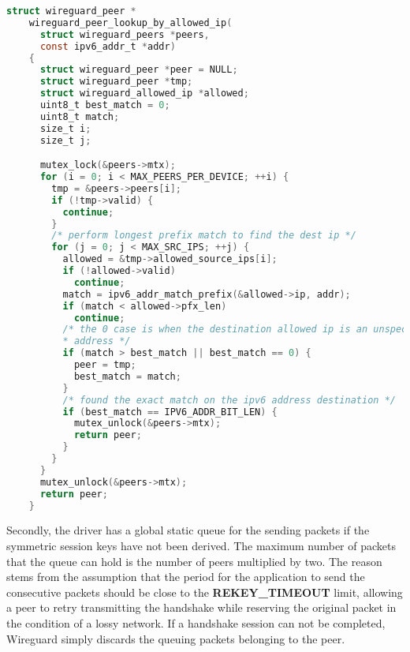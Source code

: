   \begin{lstlisting}[caption = Allowed IP address lookup,language=C, label={lst:allowedip}]
    struct wireguard_peer *
    wireguard_peer_lookup_by_allowed_ip(
      struct wireguard_peers *peers,
      const ipv6_addr_t *addr) 
    {
      struct wireguard_peer *peer = NULL;
      struct wireguard_peer *tmp;
      struct wireguard_allowed_ip *allowed;
      uint8_t best_match = 0;
      uint8_t match;
      size_t i;
      size_t j;

      mutex_lock(&peers->mtx);
      for (i = 0; i < MAX_PEERS_PER_DEVICE; ++i) {
        tmp = &peers->peers[i];
        if (!tmp->valid) {
          continue;
        }
        /* perform longest prefix match to find the dest ip */
        for (j = 0; j < MAX_SRC_IPS; ++j) {
          allowed = &tmp->allowed_source_ips[i];
          if (!allowed->valid)
            continue;
          match = ipv6_addr_match_prefix(&allowed->ip, addr);
          if (match < allowed->pfx_len)
            continue;
          /* the 0 case is when the destination allowed ip is an unspecified IPv6
          * address */
          if (match > best_match || best_match == 0) {
            peer = tmp;
            best_match = match;
          }
          /* found the exact match on the ipv6 address destination */
          if (best_match == IPV6_ADDR_BIT_LEN) {
            mutex_unlock(&peers->mtx);
            return peer;
          }
        }
      }
      mutex_unlock(&peers->mtx);
      return peer;
    }
  \end{lstlisting}

  Secondly, the driver has a global static queue for the sending packets 
  if the symmetric session keys have not been derived. The maximum number of packets that
  the queue can hold is the number of peers multiplied by two. The reason stems from the assumption
  that the period for the application to send the consecutive packets should be close to the 
  \textbf{REKEY{\_}TIMEOUT} limit, allowing a peer to retry transmitting the handshake
  while reserving the original packet in the condition of a lossy network. If a handshake 
  session can not be completed, Wireguard simply discards the queuing packets belonging
  to the peer.


